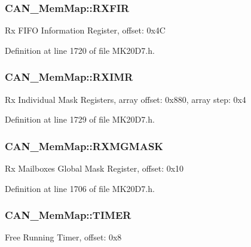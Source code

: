 \subsubsection[{\texorpdfstring{R\+X\+F\+IR}{RXFIR}}]{ C\+A\+N\+\_\+\+Mem\+Map\+::\+R\+X\+F\+IR}\hypertarget{struct_c_a_n___mem_map_a0e9b51473b3338ee0e58c54a06eb21f6}{}\label{struct_c_a_n___mem_map_a0e9b51473b3338ee0e58c54a06eb21f6}
Rx F\+I\+FO Information Register, offset\+: 0x4C 

Definition at line 1720 of file M\+K20\+D7.\+h.

\subsubsection[{\texorpdfstring{R\+X\+I\+MR}{RXIMR}}]{ C\+A\+N\+\_\+\+Mem\+Map\+::\+R\+X\+I\+MR}\hypertarget{struct_c_a_n___mem_map_a6e1efa5d1b5b3b9b732ddbc1c49afa21}{}\label{struct_c_a_n___mem_map_a6e1efa5d1b5b3b9b732ddbc1c49afa21}
Rx Individual Mask Registers, array offset\+: 0x880, array step\+: 0x4 

Definition at line 1729 of file M\+K20\+D7.\+h.

\subsubsection[{\texorpdfstring{R\+X\+M\+G\+M\+A\+SK}{RXMGMASK}}]{ C\+A\+N\+\_\+\+Mem\+Map\+::\+R\+X\+M\+G\+M\+A\+SK}\hypertarget{struct_c_a_n___mem_map_aa788d49d34c42aeb411ed6b43f1a7c42}{}\label{struct_c_a_n___mem_map_aa788d49d34c42aeb411ed6b43f1a7c42}
Rx Mailboxes Global Mask Register, offset\+: 0x10 

Definition at line 1706 of file M\+K20\+D7.\+h.

\subsubsection[{\texorpdfstring{T\+I\+M\+ER}{TIMER}}]{ C\+A\+N\+\_\+\+Mem\+Map\+::\+T\+I\+M\+ER}\hypertarget{struct_c_a_n___mem_map_a7cdd012a6030c4bf528cec65fddb71ca}{}\label{struct_c_a_n___mem_map_a7cdd012a6030c4bf528cec65fddb71ca}
Free Running Timer, offset\+: 0x8 

